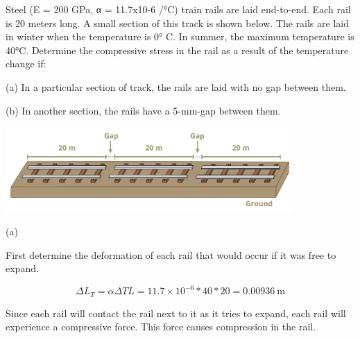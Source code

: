 \documentclass[
  letterpaper,
  DIV=11,
  numbers=noendperiod]{scrreprt}
\begin{document}
\begin{tcolorbox}[enhanced jigsaw, colbacktitle=quarto-callout-note-color!10!white, title={Example 5.8: Indeterminate thermal expansion without gap. Then add gap
and rework}, coltitle=black, leftrule=.75mm, rightrule=.15mm, opacityback=0, breakable, colframe=quarto-callout-note-color-frame, left=2mm, arc=.35mm, colback=white, bottomrule=.15mm, bottomtitle=1mm, toptitle=1mm, titlerule=0mm, opacitybacktitle=0.6, toprule=.15mm]

Steel (E = 200 GPa, α = 11.7x10-6 /°C) train rails are laid end-to-end.
Each rail is 20 meters long. A small section of this track is shown
below. The rails are laid in winter when the temperature is 0° C. In
summer, the maximum temperature is 40°C. Determine the compressive
stress in the rail as a result of the temperature change if:

(a) In a particular section of track, the rails are laid with no gap
between them.

(b) In another section, the rails have a 5-mm-gap between them.

\begin{center}
\includegraphics[width=4.33333in,height=\textheight]{images/PNGs/Example 5.8.png}
\end{center}

\begin{tcolorbox}[enhanced jigsaw, colbacktitle=quarto-callout-note-color!10!white, title={Solution}, coltitle=black, leftrule=.75mm, rightrule=.15mm, opacityback=0, breakable, colframe=quarto-callout-note-color-frame, left=2mm, arc=.35mm, colback=white, bottomrule=.15mm, bottomtitle=1mm, toptitle=1mm, titlerule=0mm, opacitybacktitle=0.6, toprule=.15mm]

(a)

First determine the deformation of each rail that would occur if it was
free to expand.

\[
\Delta L_T=\alpha \Delta T L=11.7 \times 10^{-6} * 40 * 20=0.00936 \mathrm{~m}
\]

Since each rail will contact the rail next to it as it tries to expand,
each rail will experience a compressive force. This force causes
compression in the rail.


\end{tcolorbox}
\end{tcolorbox}
\end{document}
